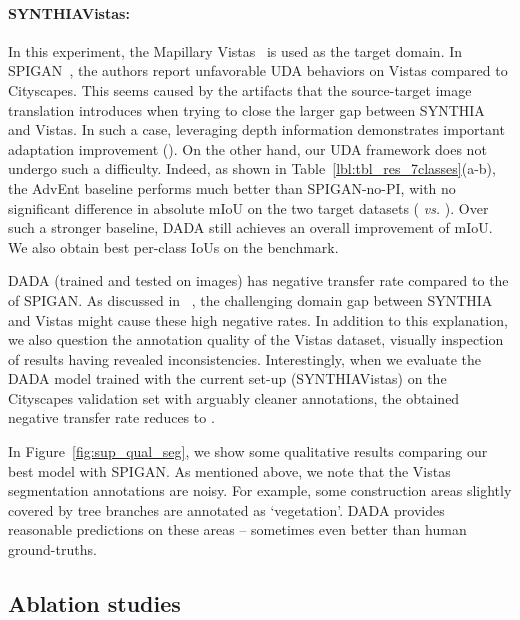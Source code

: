\documentclass[10pt,twocolumn,letterpaper]{article}
\begin{document}
\paragraph{SYNTHIAVistas:} In this experiment, the Mapillary Vistas~\cite{MVD2017} is used as the target domain. 
In SPIGAN~\cite{lee2018spigan}, the authors report unfavorable UDA behaviors on Vistas compared to Cityscapes. 
This seems caused by the artifacts that the source-target image translation introduces when trying to close the larger gap between SYNTHIA and Vistas.
In such a case, leveraging depth information demonstrates important adaptation improvement ().
On the other hand, our UDA framework does not undergo such a difficulty.
Indeed, as shown in Table~\ref{lbl:tbl_res_7classes}(a-b), the AdvEnt baseline performs much better than SPIGAN-no-PI, with no significant difference in absolute mIoU on the two target datasets ( \textit{vs.} ).
Over such a stronger baseline, DADA still achieves an overall improvement of  mIoU.
We also obtain best per-class IoUs on the benchmark.

DADA (trained and tested on  images) has  negative transfer rate compared to the  of SPIGAN. As discussed in ~\cite{lee2018spigan}, the challenging domain gap between SYNTHIA and Vistas might cause  these high negative rates. In addition to this explanation, we also question the annotation quality of the Vistas dataset, visually inspection of results having revealed inconsistencies. 
Interestingly, when we evaluate the DADA model trained with the current set-up (SYNTHIAVistas) on the Cityscapes validation set with arguably cleaner annotations, the obtained negative transfer rate reduces to .

In Figure~\ref{fig:sup_qual_seg}, we show some qualitative results comparing our best model with SPIGAN.
As mentioned above, we note that the Vistas segmentation annotations are noisy.
For example, some construction areas slightly covered by tree branches are annotated as `vegetation'.
DADA provides reasonable predictions on these areas -- sometimes even better than human ground-truths.

\subsection{Ablation studies} \label{sec:exp_abl}
\end{document}

